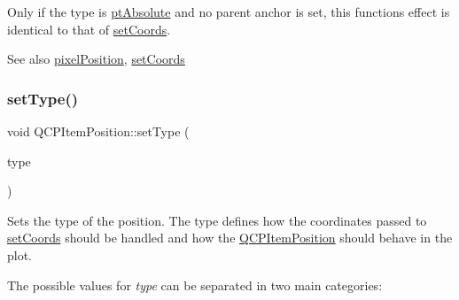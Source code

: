 Only if the type is \mbox{\hyperlink{class_q_c_p_item_position_aad9936c22bf43e3d358552f6e86dbdc8a564f5e53e550ead1ec5fc7fc7d0b73e0}{pt\+Absolute}} and no parent anchor is set, this function\textquotesingle{}s effect is identical to that of \mbox{\hyperlink{class_q_c_p_item_position_aa988ba4e87ab684c9021017dcaba945f}{set\+Coords}}.

\begin{DoxySeeAlso}{See also}
\mbox{\hyperlink{class_q_c_p_item_position_a3b5a12a8e5081c1a5bb878ffdcfa92ad}{pixel\+Position}}, \mbox{\hyperlink{class_q_c_p_item_position_aa988ba4e87ab684c9021017dcaba945f}{set\+Coords}} 
\end{DoxySeeAlso}
\mbox{\label{class_q_c_p_item_position_aa476abf71ed8fa4c537457ebb1a754ad}} 
\subsubsection{\texorpdfstring{set\+Type()}{setType()}}
{\footnotesize\ttfamily void Q\+C\+P\+Item\+Position\+::set\+Type (\begin{DoxyParamCaption}\item[{\mbox{\hyperlink{class_q_c_p_item_position_aad9936c22bf43e3d358552f6e86dbdc8}{Q\+C\+P\+Item\+Position\+::\+Position\+Type}}}]{type }\end{DoxyParamCaption})}

Sets the type of the position. The type defines how the coordinates passed to \mbox{\hyperlink{class_q_c_p_item_position_aa988ba4e87ab684c9021017dcaba945f}{set\+Coords}} should be handled and how the \mbox{\hyperlink{class_q_c_p_item_position}{Q\+C\+P\+Item\+Position}} should behave in the plot.

The possible values for {\itshape type} can be separated in two main categories\+:

